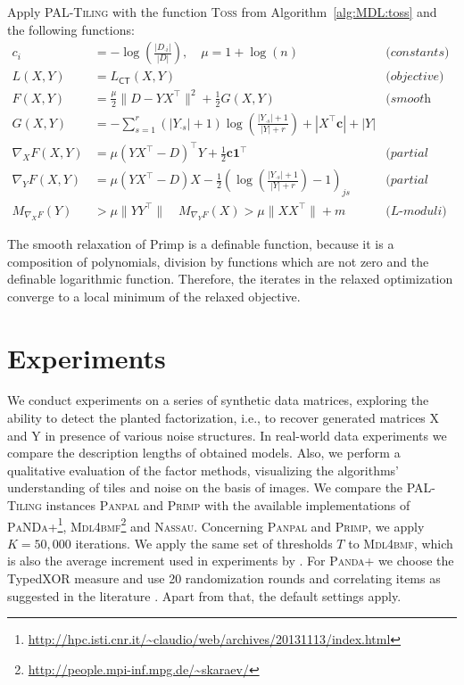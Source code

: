 \begin{mybox}
\begin{algSpec}[Primp]\label{algSpec:Primp}
Apply \textsc{PAL-Tiling} with the function \textsc{Toss} from Algorithm~\ref{alg:MDL:toss} and the following functions:
\begin{align*}
    c_i&=-\log\left(\frac{|D_{\cdot i}|}{|D|}\right),\quad \mu= 1+\log(n) &\textit{(constants)}\\
    L(X,Y)&= L_{\mathsf{CT}}(X,Y) & \textit{(objective)}\\
    F(X,Y)&=\frac{\mu}{2}\|D-YX^\top \|^2+ \frac{1}{2}G(X,Y) & \textit{(smooth part)}\\
    G(X,Y)&=-\sum_{s=1}^r(|Y_{\cdot s}|+1)\log\left(\frac{|Y_{\cdot s}|+1}{|Y|+r}\right) +|X^\top \mathbf{c}| +|Y|&\\
    \nabla_XF(X,Y)&=\mu(YX^\top -D)^\top Y+\frac{1}{2}\mathbf{c}\mathbf{1}^\top  & \textit{(partial gradient X)}\\
    \nabla_YF(X,Y)&=\mu(YX^\top -D)X-\frac{1}{2}\left(\log\left(\frac{|Y_{\cdot s}|+1}{|Y|+r}\right)-1\right)_{js}& \textit{(partial gradient Y)}\\
    M_{\nabla_X F}(Y)&>\mu\|YY^\top \|\quad M_{\nabla_Y F}(X)>\mu\|XX^\top \|+m & \textit{(L-moduli)}
\end{align*}
\end{algSpec}
\end{mybox}
The smooth relaxation of Primp is a definable function, because it is a composition of polynomials, division by functions which are not zero and the definable logarithmic function. Therefore, the iterates in the relaxed optimization converge to a local minimum of the relaxed objective.
\section{Experiments}\label{sec:MDL:Experiments}
We conduct experiments on a series of synthetic data matrices, exploring the ability to detect the planted factorization, i.e., to recover generated matrices X and Y in presence of various noise structures. In real-world data experiments we compare the description lengths of obtained models. Also, we perform a qualitative evaluation of the factor methods, visualizing the algorithms' understanding of tiles and noise on the basis of images. We compare the \textsc{PAL-Tiling} instances \textsc{Panpal} and \textsc{Primp} with the available implementations of 
\textsc{PaNDa+}\footnote{\url{http://hpc.isti.cnr.it/~claudio/web/archives/20131113/index.html}}, \textsc{Mdl4bmf}\footnote{\label{note1}\url{http://people.mpi-inf.mpg.de/~skaraev/}} and \textsc{Nassau}. Concerning \textsc{Panpal} and \textsc{Primp}, we apply $K=50,000$ iterations. We apply the same set of thresholds $T$  to \textsc{Mdl4bmf}, which is also the average increment used in experiments by \cite{miettinen2014mdl4bmf,lucchese2014unifying,karaev2015getting}. For \textsc{Panda+} we choose the TypedXOR measure and use 20 randomization rounds and correlating items as suggested in the literature \citep{lucchese2014unifying}. Apart from that, the default settings apply. 

